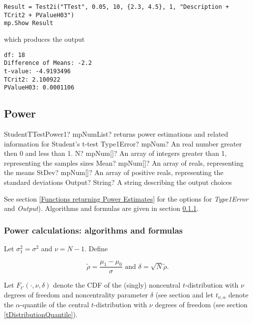 \begin{lstlisting}
Result = Test2i("TTest", 0.05, 10, {2.3, 4.5}, 1, "Description + TCrit2 + PValueH03")
mp.Show Result
\end{lstlisting}
which produces the output

\begin{verbatim}
df: 18
Difference of Means: -2.2
t-value: -4.9193496
TCrit2: 2.100922
PValueH03: 0.0001106
\end{verbatim}





\newpage
\subsection{Power}

\begin{mpFunctionsExtract}
	\mpFunctionFiveNotImplemented
	{StudentTTestPower1? mpNumList? returns power estimations and related information for Student's t-test}
	{Type1Error? mpNum? An real number greater then 0 and less than 1.}
	{N? mpNum[]? An array of integers greater than 1, representing the samples sizes}
	{Mean? mpNum[]? An array of reals, representing the means}
	{StDev? mpNum[]? An array of positive reals, representing the standard deviations}
	{Output? String? A string describing the output choices}
\end{mpFunctionsExtract}

\vspace{0.3cm}
See section \ref{Functions returning Power Estimates} for the options for {\itshape\sffamily Type1Error} and {\itshape\sffamily Output}). Algorithms and formulas are given in section \ref{1SampleTTest_Power}.


\subsubsection{Power calculations: algorithms and formulas}
\label{1SampleTTest_Power}
Let $\sigma_1^2 = \sigma^2$ and $\nu=N-1$. Define

\begin{equation} \label{eq:TTestPower1}
	\widetilde{\rho} = \frac{\mu_1-\mu_0}{\sigma} \text{ and } \delta = \sqrt{N} \widetilde{\rho}.
\end{equation}



\vspace{0.3cm}
Let $F_{t'}\left(\cdot, \nu, \delta \right)$ denote the CDF of the (singly) noncentral $t$-distribution with $\nu$ degrees of freedom and noncentrality parameter $\delta$ (see section 
and let $t_{\nu,\alpha}$ denote the $\alpha$-quantile of the central $t$-distribution with $\nu$ degrees of freedom (see section \ref{tDistributionQuantile}).


